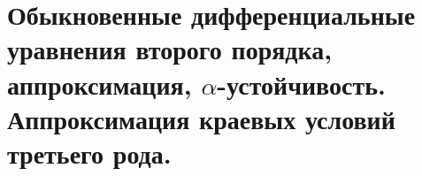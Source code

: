 \section{Обыкновенные дифференциальные уравнения второго порядка, аппроксимация, $\alpha$-устойчивость. Аппроксимация краевых условий третьего рода.}
